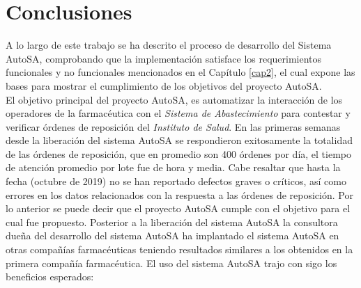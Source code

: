 \chapter{Conclusiones}\label{cap5}

A lo largo de este trabajo se ha descrito el proceso de desarrollo del Sistema AutoSA, comprobando que la implementación satisface los requerimientos funcionales y no funcionales mencionados en el Capítulo \ref{cap2}, el cual expone las bases para mostrar el cumplimiento de los objetivos del proyecto AutoSA.\\
El objetivo principal del proyecto AutoSA, es automatizar la interacción de los operadores de la farmacéutica con el \textit{Sistema de Abastecimiento} para contestar y verificar órdenes de reposición del \textit{Instituto de Salud}. En las primeras semanas desde la liberación del sistema AutoSA se respondieron exitosamente la totalidad de las órdenes de reposición, que en promedio son 400 órdenes por día, el tiempo de atención promedio por lote fue de hora y media. Cabe resaltar que hasta la fecha (octubre de 2019) no se han reportado defectos graves o críticos, así como errores en los datos relacionados con la respuesta a las órdenes de reposición. Por lo anterior se puede decir que el proyecto AutoSA cumple con el objetivo para el cual fue propuesto. Posterior a la liberación del sistema AutoSA la consultora dueña del desarrollo del sistema AutoSA ha implantado el sistema AutoSA en otras compañías farmacéuticas teniendo resultados similares a los obtenidos en la primera compañía farmacéutica. El uso del sistema AutoSA trajo con sigo los beneficios esperados:
